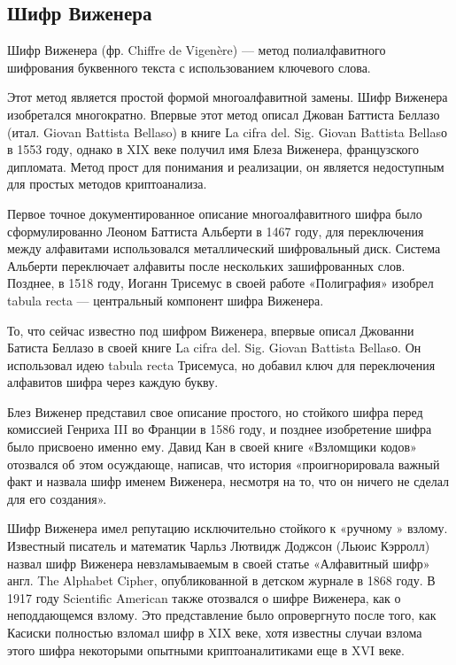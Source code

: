 \subsection{Шифр Виженера}
Шифр Виженера (фр. Chiffre de Vigenère) — метод полиалфавитного 
шифрования буквенного текста с использованием ключевого слова.

Этот метод является простой формой многоалфавитной замены. Шифр 
Виженера изобретался многократно. Впервые этот метод описал Джован 
Баттиста Беллазо (итал. Giovan Battista Bellaso) в книге La cifra 
del. Sig. Giovan Battista Bellasо в 1553 году, однако в XIX веке 
получил имя Блеза Виженера, французского дипломата. Метод прост 
для понимания и реализации, он является недоступным для простых 
методов криптоанализа.

Первое точное документированное описание многоалфавитного шифра 
было сформулированно Леоном Баттиста Альберти в 1467 году, для 
переключения между алфавитами использовался металлический шифровальный 
диск. Система Альберти переключает алфавиты после нескольких 
зашифрованных слов. Позднее, в 1518 году, Иоганн Трисемус в своей 
работе «Полиграфия» изобрел tabula recta — центральный компонент 
шифра Виженера.

То, что сейчас известно под шифром Виженера, впервые описал Джованни 
Батиста Беллазо в своей книге La cifra del. Sig. Giovan Battista 
Bellasо. Он использовал идею tabula recta Трисемуса, но добавил 
ключ для переключения алфавитов шифра через каждую букву.

Блез Виженер представил свое описание простого, но стойкого шифра 
перед комиссией Генриха III во Франции в 1586 году, и позднее 
изобретение шифра было присвоено именно ему. Давид Кан в своей 
книге «Взломщики кодов» отозвался об этом осуждающе, написав, 
что история «проигнорировала важный факт и назвала шифр именем 
Виженера, несмотря на то, что он ничего не сделал для его создания».

Шифр Виженера имел репутацию исключительно стойкого к «ручному
» взлому. Известный писатель и математик Чарльз Лютвидж Доджсон 
(Льюис Кэрролл) назвал шифр Виженера невзламываемым в своей статье 
«Алфавитный шифр» англ. The Alphabet Cipher, опубликованной в 
детском журнале в 1868 году. В 1917 году Scientific American 
также отозвался о шифре Виженера, как о неподдающемся взлому. 
Это представление было опровергнуто после того, как Касиски полностью 
взломал шифр в XIX веке, хотя известны случаи взлома этого шифра 
некоторыми опытными криптоаналитиками еще в XVI веке.


